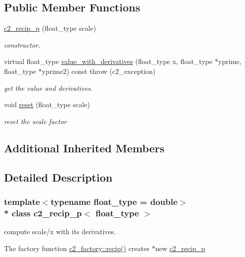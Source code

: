 \subsection*{Public Member Functions}
\begin{DoxyCompactItemize}
\item 
\hyperlink{classc2__recip__p_adb65d13c2bd17517ca734f0d336a281f}{c2\+\_\+recip\+\_\+p} (float\+\_\+type scale)
\begin{DoxyCompactList}\small\item\em constructor. \end{DoxyCompactList}\item 
virtual float\+\_\+type \hyperlink{classc2__recip__p_a0f05f680a8074a14c6d2ed5f5e1ebeca}{value\+\_\+with\+\_\+derivatives} (float\+\_\+type x, float\+\_\+type $\ast$yprime, float\+\_\+type $\ast$yprime2) const   throw (c2\+\_\+exception)
\begin{DoxyCompactList}\small\item\em get the value and derivatives. \end{DoxyCompactList}\item 
void \hyperlink{classc2__recip__p_a94758675f4ec349d45b4449a8e51dbbd}{reset} (float\+\_\+type scale)
\begin{DoxyCompactList}\small\item\em reset the scale factor \end{DoxyCompactList}\end{DoxyCompactItemize}
\subsection*{Additional Inherited Members}


\subsection{Detailed Description}
\subsubsection*{template$<$typename float\+\_\+type = double$>$\\*
class c2\+\_\+recip\+\_\+p$<$ float\+\_\+type $>$}

compute scale/x with its derivatives.

The factory function \hyperlink{classc2__factory_adda01279d6b1059843e2aecc5be5d95e}{c2\+\_\+factory\+::recip()} creates $\ast$new \hyperlink{classc2__recip__p}{c2\+\_\+recip\+\_\+p} 


